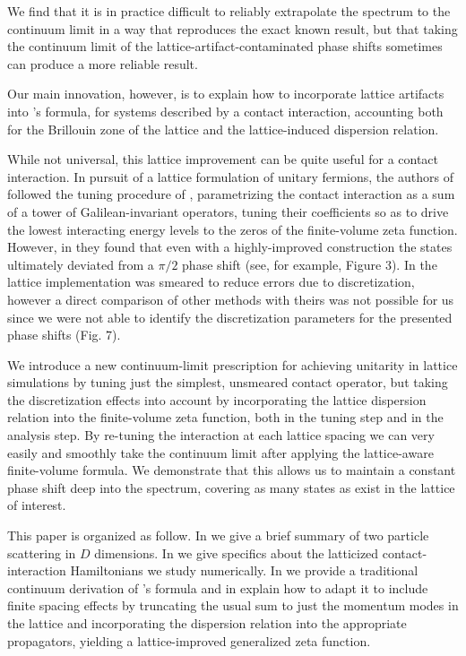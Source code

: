 We find that it is in practice difficult to reliably extrapolate the spectrum to the continuum limit in a way that reproduces the exact known result, but that taking the continuum limit of the lattice-artifact-contaminated phase shifts sometimes can produce a more reliable result.

Our main innovation, however, is to explain how to incorporate lattice artifacts into \Luscher's formula, for systems described by a contact interaction, accounting both for the Brillouin zone of the lattice and the lattice-induced dispersion relation.

While not universal, this lattice improvement can be quite useful for a contact interaction.
In pursuit of a lattice formulation of unitary fermions, the authors of  followed the tuning procedure of , parametrizing the contact interaction as a sum of a tower of Galilean-invariant operators, tuning their coefficients so as to drive the lowest interacting energy levels to the zeros of the \Luscher finite-volume zeta function.
However, in  they found that even with a highly-improved construction the states ultimately deviated from a $\pi/2$ phase shift (see, for example, Figure 3).
In  the lattice implementation was smeared to reduce errors due to discretization, however a direct comparison of other methods with theirs was not possible for us since we were not able to identify the discretization parameters for the presented phase shifts (Fig. 7).

We introduce a new continuum-limit prescription for achieving unitarity in lattice simulations by tuning just the simplest, unsmeared contact operator, but taking the discretization effects into account by incorporating the lattice dispersion relation into the finite-volume zeta function, both in the tuning step and in the analysis step.
By re-tuning the interaction at each lattice spacing we can very easily and smoothly take the continuum limit after applying the lattice-aware finite-volume formula.
We demonstrate that this allows us to maintain a constant phase shift deep into the spectrum, covering as many \Aoneg states as exist in the lattice of interest.

This paper is organized as follow.  In  we give a brief summary of two particle scattering in $D$ dimensions.
In  we give specifics about the latticized contact-interaction Hamiltonians we study numerically.
In  we provide a traditional continuum derivation of \Luscher's formula and in  explain how to adapt it to include finite spacing effects by truncating the usual sum to just the momentum modes in the lattice and incorporating the dispersion relation into the appropriate propagators, yielding a lattice-improved generalized \Luscher zeta function.

